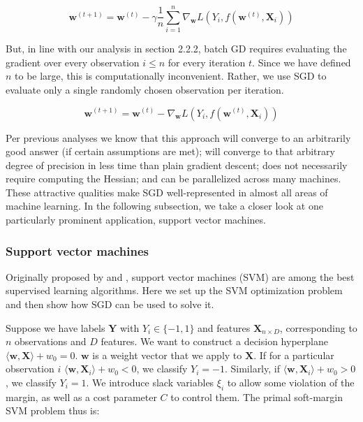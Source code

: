 \documentclass{article}
\begin{document}
\begin{equation}
	\bm{w}^{(t+1)} = \bm{w}^{(t)} - \gamma \frac{1}{n}\sum_{i=1}^n
	\nabla_{\bm{w}} L(Y_i, f(\bm{w}^{(t)}, \bm{X}_i))
\end{equation}

But, in line with our analysis in section 2.2.2, batch GD requires evaluating
the gradient over every observation $i \leq n$ for every iteration $t$. Since we have defined $n$ to be
large, this is computationally inconvenient. Rather, we use SGD to evaluate only
a single randomly chosen observation per iteration.

\begin{equation}
	\bm{w}^{(t+1)} = \bm{w}^{(t)} - \nabla_{\bm{w}} L(Y_i, f(\bm{w}^{(t)}, \bm{X}_i))
\end{equation}

Per previous analyses we know that this approach will converge to an arbitrarily
good answer (if certain assumptions are met); will converge to that arbitrary
degree of precision in less time than plain gradient descent; does not
necessarily require computing the Hessian; and can be parallelized across many
machines. These attractive qualities make SGD well-represented in almost all areas of
machine learning. In the following subsection, we take a closer look at one
particularly prominent application, support vector machines.

\subsubsection{Support vector machines}

Originally proposed by \cite{boser1992training} and \cite{cortes1995support}, support vector machines (SVM)
are among the best supervised learning algorithms. Here we set up the SVM
optimization
problem and then show how SGD can be used to solve it.

Suppose we have labels $\bm{Y}$ with $Y_i \in \{-1,1\}$ and features $\bm{X}_{n
\times D}$, corresponding to $n$ observations and $D$ features.
We want to construct a decision hyperplane 
$\langle \bm{w}, \bm{X} \rangle + w_0= 0$. $\bm{w}$ is
a weight vector that we apply to $\bm{X}$. If for a particular observation $i$
$\langle \bm{w}, \bm{X}_i \rangle + w_0 < 0$, we
classify $Y_i=-1$. Similarly, if $\langle \bm{w}, \bm{X}_i \rangle + w_0 > 0$, we
classify $Y_i = 1$. We introduce slack variables $\xi_i$ to allow some
violation of the margin, as well as a cost parameter $C$ to control them. The
primal soft-margin SVM problem thus is:
\end{document}
